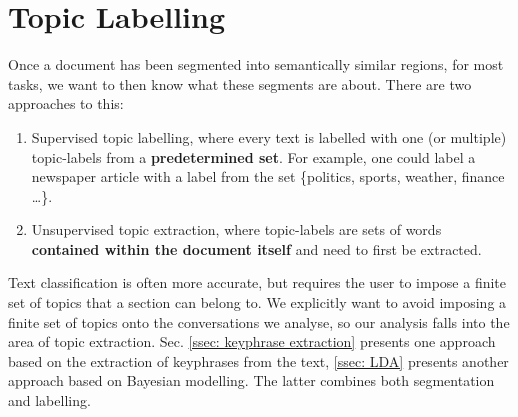 \section{Topic Labelling \label{ssec: topic labelling}}

Once a document has been segmented into semantically similar regions, for most tasks, we want to then know what these segments are about. There are two approaches to this:

\begin{enumerate}
    \item Supervised topic labelling, where every text is labelled with one (or multiple) topic-labels from a \textbf{predetermined set}\cite{surverTextClassification}. For example, one could label a newspaper article with a label from the set \{politics, sports, weather, finance \dots\}.
    \item Unsupervised topic extraction, where topic-labels are sets of words \textbf{contained within the document itself} and need to first be extracted.
\end{enumerate}

Text classification is often more accurate\cite{surverTextClassification}, but requires the user to impose a finite set of topics that a section can belong to. We explicitly want to avoid imposing a finite set of topics onto the conversations we analyse, so our analysis falls into the area of topic extraction. Sec. \ref{ssec: keyphrase extraction} presents one approach based on the extraction of \glspl{keyphrase} from the text, \ref{ssec: LDA} presents another approach based on Bayesian modelling. The latter combines both segmentation and labelling\cite{purver2006unsupervised, eisenstein2008bayesian}.
